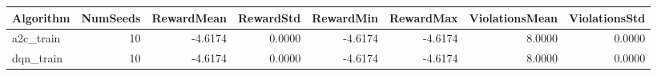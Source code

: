 \begin{tabular}{lrrrrrrr}
\toprule
Algorithm & NumSeeds & RewardMean & RewardStd & RewardMin & RewardMax & ViolationsMean & ViolationsStd \\
\midrule
a2c_train & 10 & -4.6174 & 0.0000 & -4.6174 & -4.6174 & 8.0000 & 0.0000 \\
dqn_train & 10 & -4.6174 & 0.0000 & -4.6174 & -4.6174 & 8.0000 & 0.0000 \\
\bottomrule
\end{tabular}

